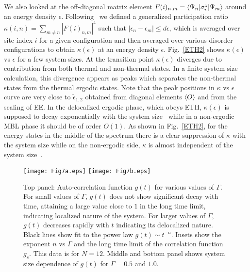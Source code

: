 \documentclass[prl,aps,twocolumn,floats,nofootinbib]{revtex4}
\begin{document}
We also looked at the off-diagonal matrix element $F(i)_{n,m} = \langle\Psi_n|\sigma^z_i|\Psi_m\rangle$ around an energy density $\epsilon$. Following~\cite{Baldwin} we defined a generalized participation ratio $\kappa(i,n)= \sum_{m\ne n} |F(i)_{n,m}|^4$ such that $|\epsilon_n-\epsilon_m| \le d\epsilon$, which is averaged over site index $i$ for a given configuration and then averaged over various disorder configurations to obtain $\kappa(\epsilon)$ at an energy density $\epsilon$. 
Fig.~\ref{ETH2} shows $\kappa(\epsilon)$ vs $\epsilon$ for a few system sizes. At the transition point $\kappa(\epsilon)$ diverges due to contribution from both thermal and non-thermal states. In a finite system size calculation, this divergence appears as peaks which separates the non-thermal states from the thermal ergodic states. Note that the peak positions in $\kappa$ vs $\epsilon$ curve are very close to $\tilde{\epsilon}_{1,2}$ obtained from diagonal elements $\langle O \rangle$ and from the scaling of EE.  In the delocalized ergodic phase, which obeys ETH, $\kappa(\epsilon)$ is supposed to decay exponentially with the system size~\cite{Baldwin} while in a non-ergodic MBL phase it should be of order $O(1)$. As shown in Fig.~\ref{ETH2}, for the energy states in the middle of the spectrum there is a clear suppression of $\kappa$ with the system size while on the non-ergodic side, $\kappa$ is almost independent of the system size~\cite{footnote}. 

\begin{figure}[h!]
\begin{center}
\vskip0.5cm
\texttt{[image: Fig7a.eps]}
\hskip3cm
\texttt{[image: Fig7b.eps]}
\caption{Top panel: Auto-correlation function $g(t)$ for various values of $\Gamma$. For small values of $\Gamma$, $g(t)$ does not show significant decay with time, attaining a large value close to $1$ in the long time limit, indicating localized nature of the system. For larger values of $\Gamma$, $g(t)$ decreases rapidly with $t$ indicating its delocalized nature. Black lines show fit to the power law $g(t)\sim t^{-n}$. Insets show the exponent $n$ vs $\Gamma$ and the long time limit of the correlation function $g_s$. This data is for $N=12$. Middle and bottom panel shows system size dependence of $g(t)$ for $\Gamma=0.5$ and $1.0$.}
\label{gt}
\end{center}
\end{figure}
\end{document}
